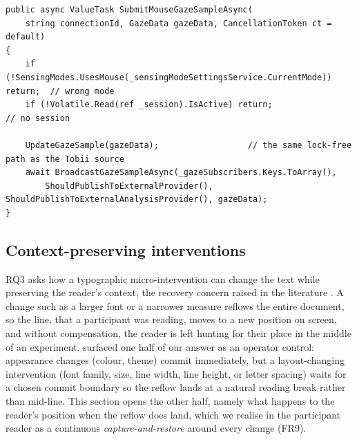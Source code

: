 \begin{listing}[htbp]
\begin{verbatim}
public async ValueTask SubmitMouseGazeSampleAsync(
    string connectionId, GazeData gazeData, CancellationToken ct = default)
{
    if (!SensingModes.UsesMouse(_sensingModeSettingsService.CurrentMode)) return;  // wrong mode
    if (!Volatile.Read(ref _session).IsActive) return;                             // no session

    UpdateGazeSample(gazeData);                  // the same lock-free path as the Tobii source
    await BroadcastGazeSampleAsync(_gazeSubscribers.Keys.ToArray(),
        ShouldPublishToExternalProvider(), ShouldPublishToExternalAnalysisProvider(), gazeData);
}
\end{verbatim}
\caption{Mouse samples joining the hardware path (abbreviated from \texttt{ExperimentSessionManager.Gaze.cs}): two guards, then the same \texttt{UpdateGazeSample} (\cref{lst:impl-hotpath}) as the Tobii source.}
\label{lst:impl-mouseingest}
\end{listing}

\FloatBarrier
\subsection{Context-preserving interventions}
\label{sec:impl-context}

RQ3 asks how a typographic micro-intervention can change the text while preserving the reader's context, the recovery concern raised in the literature \cite{jensen2025context}.
A change such as a larger font or a narrower measure reflows the entire document, so the line, that a participant was reading, moves to a new position on screen, and without compensation, the reader is left hunting for their place in the middle of an experiment.
 surfaced one half of our answer as an operator control: appearance changes (colour, theme) commit immediately, but a layout-changing intervention (font family, size, line width, line height, or letter spacing) waits for a chosen commit boundary so the reflow lands at a natural reading break rather than mid-line.
This section opens the other half, namely what happens to the reader's position when the reflow does land, which we realise in the participant reader as a continuous \emph{capture-and-restore} around every change (FR9).

